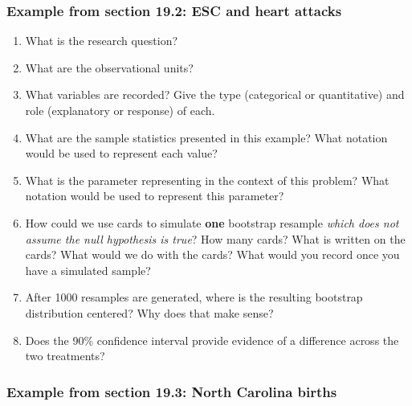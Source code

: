 \documentclass[
]{report}
\newcommand{\rgs}{\vspace{12pt}} %
\begin{document}
\hypertarget{example-from-section-19.2-esc-and-heart-attacks}{%
\subsubsection*{Example from section 19.2: ESC and heart attacks}\label{example-from-section-19.2-esc-and-heart-attacks}}

\begin{enumerate}
\def\labelenumi{\arabic{enumi}.}
\item
  What is the research question?
  \rgs
\item
  What are the observational units?
  \rgs
\item
  What variables are recorded? Give the type (categorical or quantitative) and role (explanatory or response) of each.
  \rgs
  \rgs
\item
  What are the sample statistics presented in this example? What notation would be used to represent each value?
  \rgs
\item
  What is the parameter representing in the context of this problem? What notation would be used to represent this parameter?
  \rgs
  \rgs
\item
  How could we use cards to simulate \textbf{one} bootstrap resample \emph{which does not assume the null hypothesis is true}? How many cards? What is written on the cards? What would we do with the cards? What would you record once you have a simulated sample?
  \rgs
  \rgs
  \rgs
\item
  After 1000 resamples are generated, where is the resulting bootstrap distribution centered? Why does that make sense?
  \rgs
  \rgs
\item
  Does the 90\% confidence interval provide evidence of a difference across the two treatments?
  \rgs
  \rgs
\end{enumerate}

\hypertarget{example-from-section-19.3-north-carolina-births}{%
\subsubsection*{Example from section 19.3: North Carolina births}\label{example-from-section-19.3-north-carolina-births}}
\end{document}
